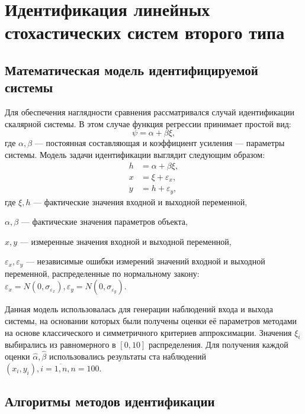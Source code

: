 \chapter[Идентификация линейных стохастических систем второго типа]{%
  Идентификация линейных стохастических систем второго типа
}

\section{Математическая модель идентифицируемой системы}

Для обеспечения наглядности сравнения рассматривался случай идентификации скалярной системы.
В этом случае функция регрессии принимает простой вид:
\begin{equation}
  \psi = \alpha + \beta \xi,
  \label{eq:fun_linear_scalar}
\end{equation}
где \( \alpha, \beta \) --- постоянная составляющая и коэффициент усиления ---
параметры системы. Модель задачи идентификации выглядит следующим образом:
\begin{equation}
  \label{eq:model_linear_scalar}
  \begin{aligned}
  h &= \alpha + \beta \xi, \\
  x &= \xi + \varepsilon_x, \\
  y &= h + \varepsilon_y,
  \end{aligned}
\end{equation}
где \( \xi, h \) --- фактические значения входной и выходной переменной, \par
\( \alpha, \beta \) --- фактические значения параметров объекта, \par
\( x, y \) --- измеренные значения входной и выходной переменной, \par
\( \varepsilon_x, \varepsilon_y \) --- независимые ошибки измерений значений входной и
выходной переменной, распределенные по нормальному закону:
\(
\varepsilon_x = N(0, \sigma_{\varepsilon_x}),
\varepsilon_y = N(0, \sigma_{\varepsilon_y})
\).

Данная модель использовалась для генерации наблюдений входа и выхода системы,
на основании которых были получены оценки её параметров методами на основе
классического и симметричного критериев аппроксимации.
Значения \( \xi_i \) выбирались из равномерного в \( [0, 10] \) распределения.
Для получения каждой оценки \( \hat{\alpha}, \hat{\beta} \) использовались результаты
ста наблюдений \( ( x_i, y_i ), i = \overline{1, n}, n = 100 \).

\section{Алгоритмы методов идентификации}

